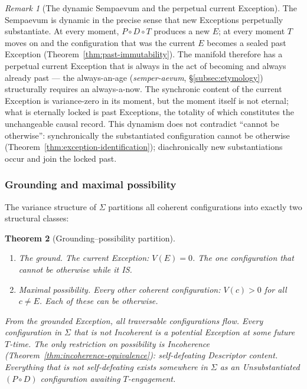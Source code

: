 \documentclass[11pt,a4paper]{article}
\newtheorem{theorem}{Theorem}[section]
\theoremstyle{definition}
\theoremstyle{remark}
\newtheorem{remark}[theorem]{Remark}
\begin{document}
\begin{remark}[The dynamic Sempaevum and the perpetual current Exception]\label{rem:perpetual-E}
The Sempaevum is dynamic in the precise sense that new Exceptions perpetually substantiate. At every moment, $P\circ D\circ T$ produces a new $E$; at every moment $T$ moves on and the configuration that was the current $E$ becomes a sealed past Exception (Theorem~\ref{thm:past-immutability}). The manifold therefore has a perpetual current Exception that is always in the act of becoming and always already past --- the always-an-age (\emph{semper-aevum}, \S\ref{subsec:etymology}) structurally requires an always-a-now. The synchronic content of the current Exception is variance-zero in its moment, but the moment itself is not eternal; what is eternally locked is past Exceptions, the totality of which constitutes the unchangeable causal record. This dynamism does not contradict ``cannot be otherwise'': synchronically the substantiated configuration cannot be otherwise (Theorem~\ref{thm:exception-identification}); diachronically new substantiations occur and join the locked past.
\end{remark}

\subsubsection{Grounding and maximal possibility}\label{subsubsec:grounding-prosperity}

The variance structure of $\Sigma$ partitions all coherent configurations into exactly two structural classes:

\begin{theorem}[Grounding--possibility partition]\label{thm:grounding-possibility}
\begin{enumerate}[label=(\roman*),leftmargin=*]
\item \emph{The ground.} The current Exception: $V(E) = 0$. The one configuration that cannot be otherwise while it IS.
\item \emph{Maximal possibility.} Every other coherent configuration: $V(c) > 0$ for all $c \neq E$. Each of these can be otherwise.
\end{enumerate}
From the grounded Exception, all traversable configurations flow. Every configuration in $\Sigma$ that is not Incoherent is a potential Exception at some future $T$-time. The only restriction on possibility is Incoherence (Theorem~\ref{thm:incoherence-equivalence}): self-defeating Descriptor content. Everything that is not self-defeating exists somewhere in $\Sigma$ as an Unsubstantiated $(P \circ D)$ configuration awaiting $T$-engagement.
\end{theorem}
\end{document}
